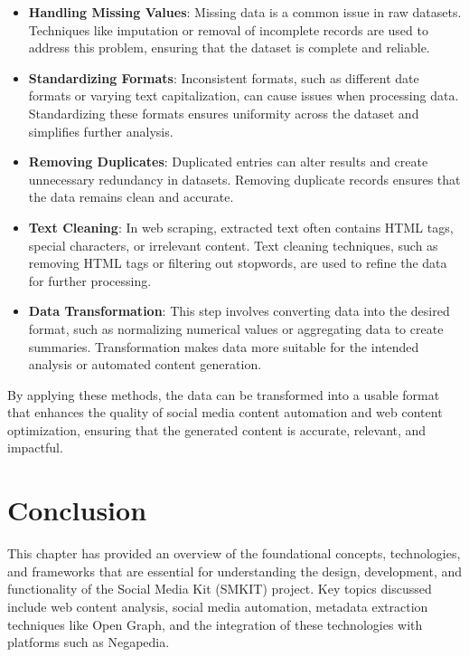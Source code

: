 \begin{itemize}
    \item \textbf{Handling Missing Values}: Missing data is a common issue in raw datasets. Techniques like imputation or removal of incomplete records are used to address this problem, ensuring that the dataset is complete and reliable.
    \item \textbf{Standardizing Formats}: Inconsistent formats, such as different date formats or varying text capitalization, can cause issues when processing data. Standardizing these formats ensures uniformity across the dataset and simplifies further analysis.
    \item \textbf{Removing Duplicates}: Duplicated entries can alter results and create unnecessary redundancy in datasets. Removing duplicate records ensures that the data remains clean and accurate.
    \item \textbf{Text Cleaning}: In web scraping, extracted text often contains HTML tags, special characters, or irrelevant content. Text cleaning techniques, such as removing HTML tags or filtering out stopwords, are used to refine the data for further processing.
    \item \textbf{Data Transformation}: This step involves converting data into the desired format, such as normalizing numerical values or aggregating data to create summaries. Transformation makes data more suitable for the intended analysis or automated content generation.
\end{itemize}

By applying these methods, the data can be transformed into a usable format that enhances the quality of social media content automation and web content optimization, ensuring that the generated content is accurate, relevant, and impactful.


\section{Conclusion}
\label{sec:preliminaries_conclusion}

This chapter has provided an overview of the foundational concepts, technologies, and frameworks that are essential for understanding the design, development, and functionality of the Social Media Kit (SMKIT) project. Key topics discussed include web content analysis, social media automation, metadata extraction techniques like Open Graph, and the integration of these technologies with platforms such as Negapedia.

